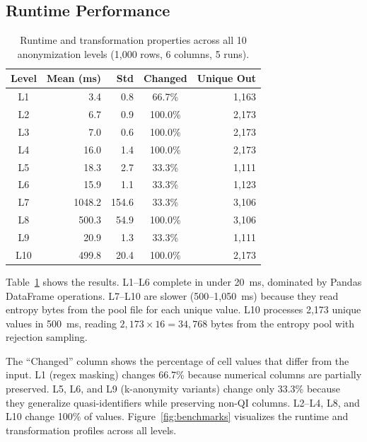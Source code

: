 \documentclass[journal]{IEEEtran}
\begin{document}
\subsection{Runtime Performance}

\begin{table}[t]
\caption{Runtime and transformation properties across all 10 anonymization levels (1,000 rows, 6 columns, 5 runs).}
\label{tab:benchmarks}
\begin{center}
\begin{tabular}{@{}crrcr@{}}
\toprule
\textbf{Level} & \textbf{Mean (ms)} & \textbf{Std} & \textbf{Changed} & \textbf{Unique Out} \\
\midrule
L1  &    3.4 &  0.8 &  66.7\% & 1,163 \\
L2  &    6.7 &  0.9 & 100.0\% & 2,173 \\
L3  &    7.0 &  0.6 & 100.0\% & 2,173 \\
L4  &   16.0 &  1.4 & 100.0\% & 2,173 \\
L5  &   18.3 &  2.7 &  33.3\% & 1,111 \\
L6  &   15.9 &  1.1 &  33.3\% & 1,123 \\
L7  & 1048.2 & 154.6 &  33.3\% & 3,106 \\
L8  &  500.3 &  54.9 & 100.0\% & 3,106 \\
L9  &   20.9 &  1.3 &  33.3\% & 1,111 \\
L10 &  499.8 &  20.4 & 100.0\% & 2,173 \\
\bottomrule
\end{tabular}
\end{center}
\end{table}

Table~\ref{tab:benchmarks} shows the results. L1--L6 complete in under 20~ms, dominated by Pandas DataFrame operations. L7--L10 are slower (500--1,050~ms) because they read entropy bytes from the pool file for each unique value. L10 processes 2,173 unique values in 500~ms, reading $2{,}173 \times 16 = 34{,}768$ bytes from the entropy pool with rejection sampling.

The ``Changed'' column shows the percentage of cell values that differ from the input. L1 (regex masking) changes 66.7\% because numerical columns are partially preserved. L5, L6, and L9 (k-anonymity variants) change only 33.3\% because they generalize quasi-identifiers while preserving non-QI columns. L2--L4, L8, and L10 change 100\% of values. Figure~\ref{fig:benchmarks} visualizes the runtime and transformation profiles across all levels.
\end{document}

